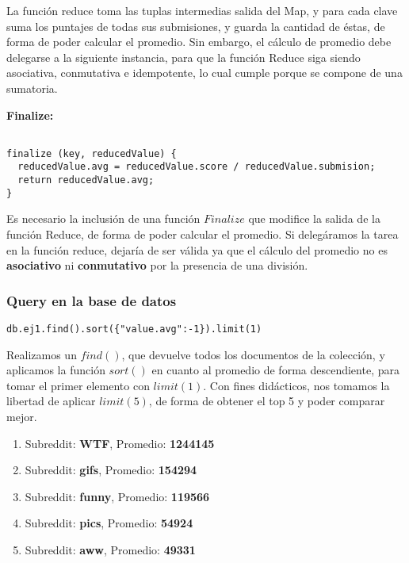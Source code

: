 La funci\'on reduce toma las tuplas intermedias salida del Map, y para cada clave suma los puntajes de todas sus submisiones, y guarda la cantidad de \'estas, de forma de poder calcular el promedio. Sin embargo, el c\'alculo de promedio debe delegarse a la siguiente instancia, para que la funci\'on Reduce siga siendo asociativa, conmutativa e idempotente, lo cual cumple porque se compone de una sumatoria.

\vspace{2mm}

\textbf{Finalize:}

\begin{lstlisting}

finalize (key, reducedValue) {
  reducedValue.avg = reducedValue.score / reducedValue.submision;
  return reducedValue.avg;
}

\end{lstlisting}

Es necesario la inclusi\'on de una funci\'on $Finalize$ que modifice la salida de la funci\'on Reduce, de forma de poder calcular el promedio. Si deleg\'aramos la tarea en la funci\'on reduce, dejar\'ia de ser v\'alida ya que el c\'alculo del promedio no es \textbf{asociativo} ni \textbf{conmutativo} por la presencia de una divisi\'on.

\vspace{2mm}

\subsubsection{Query en la base de datos}


\begin{lstlisting}
db.ej1.find().sort({"value.avg":-1}).limit(1)
\end{lstlisting}

Realizamos un $find()$, que devuelve todos los documentos de la colecci\'on, y aplicamos la funci\'on $sort()$ en cuanto al promedio de forma descendiente, para tomar el primer elemento con $limit(1)$. Con fines did\'acticos, nos tomamos la libertad de aplicar $limit(5)$, de forma de obtener el top 5 y poder comparar mejor.

\begin{enumerate}

\item Subreddit: \textbf{WTF}, Promedio: \textbf{1244145} 
\item Subreddit: \textbf{gifs}, Promedio: \textbf{154294}  
\item Subreddit: \textbf{funny}, Promedio: \textbf{119566}  
\item Subreddit: \textbf{pics}, Promedio: \textbf{54924}  
\item Subreddit: \textbf{aww}, Promedio: \textbf{49331}  


\end{enumerate}

